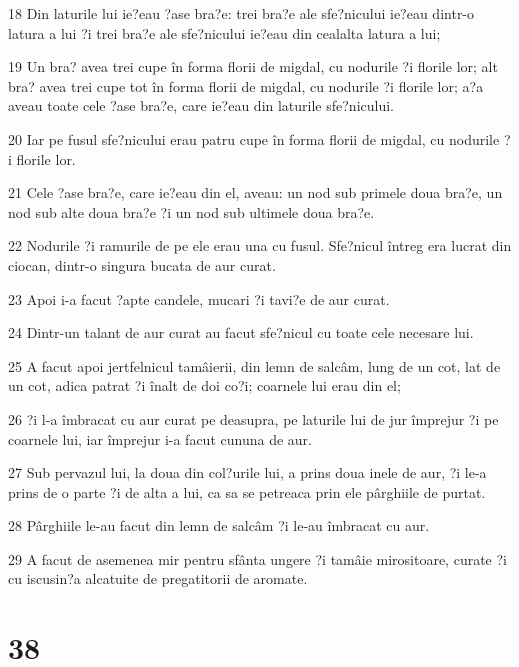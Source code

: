 \par 18 Din laturile lui ie?eau ?ase bra?e: trei bra?e ale sfe?nicului ie?eau dintr-o latura a lui ?i trei bra?e ale sfe?nicului ie?eau din cealalta latura a lui;
\par 19 Un bra? avea trei cupe în forma florii de migdal, cu nodurile ?i florile lor; alt bra? avea trei cupe tot în forma florii de migdal, cu nodurile ?i florile lor; a?a aveau toate cele ?ase bra?e, care ie?eau din laturile sfe?nicului.
\par 20 Iar pe fusul sfe?nicului erau patru cupe în forma florii de migdal, cu nodurile ?i florile lor.
\par 21 Cele ?ase bra?e, care ie?eau din el, aveau: un nod sub primele doua bra?e, un nod sub alte doua bra?e ?i un nod sub ultimele doua bra?e.
\par 22 Nodurile ?i ramurile de pe ele erau una cu fusul. Sfe?nicul întreg era lucrat din ciocan, dintr-o singura bucata de aur curat.
\par 23 Apoi i-a facut ?apte candele, mucari ?i tavi?e de aur curat.
\par 24 Dintr-un talant de aur curat au facut sfe?nicul cu toate cele necesare lui.
\par 25 A facut apoi jertfelnicul tamâierii, din lemn de salcâm, lung de un cot, lat de un cot, adica patrat ?i înalt de doi co?i; coarnele lui erau din el;
\par 26 ?i l-a îmbracat cu aur curat pe deasupra, pe laturile lui de jur împrejur ?i pe coarnele lui, iar împrejur i-a facut cununa de aur.
\par 27 Sub pervazul lui, la doua din col?urile lui, a prins doua inele de aur, ?i le-a prins de o parte ?i de alta a lui, ca sa se petreaca prin ele pârghiile de purtat.
\par 28 Pârghiile le-au facut din lemn de salcâm ?i le-au îmbracat cu aur.
\par 29 A facut de asemenea mir pentru sfânta ungere ?i tamâie mirositoare, curate ?i cu iscusin?a alcatuite de pregatitorii de aromate.

\chapter{38}

